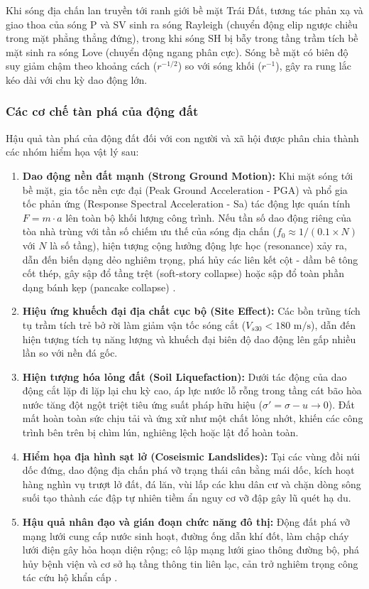 \documentclass[preprint,1p]{elsarticle}
\begin{document}
Khi sóng địa chấn lan truyền tới ranh giới bề mặt Trái Đất, tương tác phản xạ và giao thoa của sóng P và SV sinh ra sóng Rayleigh (chuyển động elip ngược chiều trong mặt phẳng thẳng đứng), trong khi sóng SH bị bẫy trong tầng trầm tích bề mặt sinh ra sóng Love (chuyển động ngang phân cực). Sóng bề mặt có biên độ suy giảm chậm theo khoảng cách ($r^{-1/2}$) so với sóng khối ($r^{-1}$), gây ra rung lắc kéo dài với chu kỳ dao động lớn.

\subsubsection{Các cơ chế tàn phá của động đất}
Hậu quả tàn phá của động đất đối với con người và xã hội được phân chia thành các nhóm hiểm họa vật lý sau:
\begin{enumerate}
    \item \textbf{Dao động nền đất mạnh (Strong Ground Motion):} Khi mặt sóng tới bề mặt, gia tốc nền cực đại (Peak Ground Acceleration - PGA) và phổ gia tốc phản ứng (Response Spectral Acceleration - Sa) tác động lực quán tính $F = m \cdot a$ lên toàn bộ khối lượng công trình. Nếu tần số dao động riêng của tòa nhà trùng với tần số chiếm ưu thế của sóng địa chấn ($f_0 \approx 1 / (0.1 \times N)$ với $N$ là số tầng), hiện tượng cộng hưởng động lực học (resonance) xảy ra, dẫn đến biến dạng dẻo nghiêm trọng, phá hủy các liên kết cột - dầm bê tông cốt thép, gây sập đổ tầng trệt (soft-story collapse) hoặc sập đổ toàn phần dạng bánh kẹp (pancake collapse) \cite{esteghamati2024efficiency,tang2022machine}.
    \item \textbf{Hiệu ứng khuếch đại địa chất cục bộ (Site Effect):} Các bồn trũng tích tụ trầm tích trẻ bở rời làm giảm vận tốc sóng cắt ($V_{s30} < 180\text{ m/s}$), dẫn đến hiện tượng tích tụ năng lượng và khuếch đại biên độ dao động lên gấp nhiều lần so với nền đá gốc.
    \item \textbf{Hiện tượng hóa lỏng đất (Soil Liquefaction):} Dưới tác động của dao động cắt lặp đi lặp lại chu kỳ cao, áp lực nước lỗ rỗng trong tầng cát bão hòa nước tăng đột ngột triệt tiêu ứng suất pháp hữu hiệu ($\sigma' = \sigma - u \to 0$). Đất mất hoàn toàn sức chịu tải và ứng xử như một chất lỏng nhớt, khiến các công trình bên trên bị chìm lún, nghiêng lệch hoặc lật đổ hoàn toàn.
    \item \textbf{Hiểm họa địa hình sạt lở (Coseismic Landslides):} Tại các vùng đồi núi dốc đứng, dao động địa chấn phá vỡ trạng thái cân bằng mái dốc, kích hoạt hàng nghìn vụ trượt lở đất, đá lăn, vùi lấp các khu dân cư và chặn dòng sông suối tạo thành các đập tự nhiên tiềm ẩn nguy cơ vỡ đập gây lũ quét hạ du.
    \item \textbf{Hậu quả nhân đạo và gián đoạn chức năng đô thị:} Động đất phá vỡ mạng lưới cung cấp nước sinh hoạt, đường ống dẫn khí đốt, làm chập cháy lưới điện gây hỏa hoạn diện rộng; cô lập mạng lưới giao thông đường bộ, phá hủy bệnh viện và cơ sở hạ tầng thông tin liên lạc, cản trở nghiêm trọng công tác cứu hộ khẩn cấp \cite{ding2025seismic}.
\end{enumerate}
\end{document}
